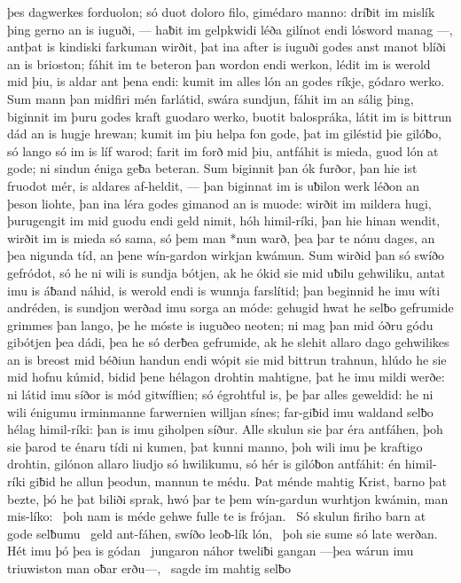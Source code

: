 þes dagwerkes forduolon; só duot doloro filo,
gimédaro manno: dríƀit im mislík þing
gerno an is iuguði, — haƀit im gelpkwidi
léða gilínot endi lósword manag —,
antþat is kindiski farkuman wirðit,
þat ina after is iuguði godes anst manot
blíði an is brioston; fáhit im te beteron þan
wordon endi werkon, lédit im is werold mid þiu,
is aldar ant þena endi: kumit im alles lón
an godes ríkje, gódaro werko.
Sum mann þan midfiri mén farlátid,
swára sundjun, fáhit im an sálig þing,
biginnit im þuru godes kraft guodaro werko,
buotit balospráka, látit im is bittrun dád
an is hugje hrewan; kumit im þiu helpa fon gode,
þat im giléstid þie gilóƀo, só lango só im is líf warod;
farit im forð mid þiu, antfáhit is mieda,
guod lón at gode; ni sindun éniga geƀa beteran.
Sum biginnit þan ók furðor, þan hie ist fruodot mér,
is aldares af-heldit, — þan biginnat im is uƀilon werk
léðon an þeson liohte, þan ina léra godes
gimanod an is muode: wirðit im mildera hugi,
þurugengit im mid guodu endi geld nimit,
hóh himil-ríki, þan hie hinan wendit,
wirðit im is mieda só sama, só þem man *nun warð,
þea þar te nónu dages, an þea nigunda tíd,
an þene wín-gardon wirkjan kwámun.
Sum wirðid þan só swíðo gefródot, só he ni wili is sundja bótjen,
ak he ókid sie mid uƀilu gehwiliku, antat imu is áƀand náhid,
is werold endi is wunnja farslítid; þan beginnid he imu wíti andréden,
is sundjon werðad imu sorga an móde: gehugid hwat he selƀo gefrumide
grimmes þan lango, þe he móste is iuguðeo neoten; ni mag þan mid óðru gódu gibótjen
þea dádi, þea he só derƀea gefrumide, ak he slehit allaro dago gehwilikes
an is breost mid béðiun handun endi wópit sie mid bittrun trahnun,
hlúdo he sie mid hofnu kúmid, bidid þene hélagon drohtin
mahtigne, þat he imu mildi werðe: ni látid imu síðor is mód gitwíflien;
só égrohtful is, þe þar alles geweldid: he ni wili énigumu irminmanne
farwernien willjan sínes; far-giƀid imu waldand selƀo
hélag himil-ríki: þan is imu giholpen síður.
Alle skulun sie þar éra antfáhen, þoh sie þarod te énaru tídi
ni kumen, þat kunni manno, þoh wili imu þe kraftigo drohtin,
gilónon allaro liudjo só hwilikumu, só hér is gilóƀon antfáhit:
én himil-ríki giƀid he allun þeodun,
mannun te médu. Þat ménde mahtig Krist,
barno þat bezte, þó he þat biliði sprak,
hwó þar te þem wín-gardun wurhtjon kwámin,
man mis-líko: \hld\ þoh nam is méde gehwe
fulle te is frójan. \hld\ Só skulun firiho barn
at gode selƀumu \hld\ geld ant-fáhen,
swíðo leoƀ-lík lón, \hld\ þoh sie sume só late werðan.
Hét imu þó þea is gódan \hld\ jungaron náhor
tweliƀi gangan —þea wárun imu triuwiston
man oƀar erðu—, \hld\ sagde im mahtig selƀo
